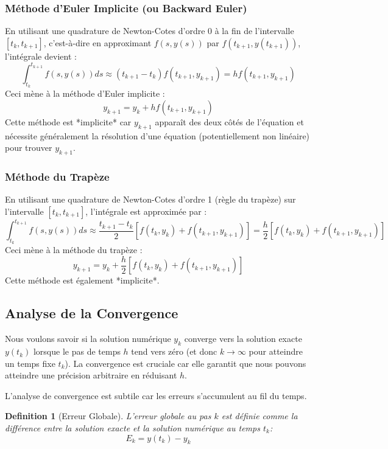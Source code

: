 \documentclass{article}
\newtheorem{definition}{Definition}
\begin{document}
\subsubsection*{Méthode d'Euler Implicite (ou Backward Euler)}

En utilisant une quadrature de Newton-Cotes d'ordre 0 à la fin de l'intervalle $[t_k, t_{k+1}]$, c'est-à-dire en approximant $f(s, y(s))$ par $f(t_{k+1}, y(t_{k+1}))$, l'intégrale devient :
\[ \int_{t_k}^{t_{k+1}} f(s, y(s)) ds \approx (t_{k+1} - t_k) f(t_{k+1}, y_{k+1}) = h f(t_{k+1}, y_{k+1}) \]
Ceci mène à la méthode d'Euler implicite :
\[ y_{k+1} = y_k + h f(t_{k+1}, y_{k+1}) \]
Cette méthode est *implicite* car $y_{k+1}$ apparaît des deux côtés de l'équation et nécessite généralement la résolution d'une équation (potentiellement non linéaire) pour trouver $y_{k+1}$.

\subsubsection*{Méthode du Trapèze}

En utilisant une quadrature de Newton-Cotes d'ordre 1 (règle du trapèze) sur l'intervalle $[t_k, t_{k+1}]$, l'intégrale est approximée par :
\[ \int_{t_k}^{t_{k+1}} f(s, y(s)) ds \approx \frac{t_{k+1} - t_k}{2} [f(t_k, y_k) + f(t_{k+1}, y_{k+1})] = \frac{h}{2} [f(t_k, y_k) + f(t_{k+1}, y_{k+1})] \]
Ceci mène à la méthode du trapèze :
\[ y_{k+1} = y_k + \frac{h}{2} [f(t_k, y_k) + f(t_{k+1}, y_{k+1})] \]
Cette méthode est également *implicite*.

\subsection*{Analyse de la Convergence}

Nous voulons savoir si la solution numérique $y_k$ converge vers la solution exacte $y(t_k)$ lorsque le pas de temps $h$ tend vers zéro (et donc $k \to \infty$ pour atteindre un temps fixe $t_k$). La convergence est cruciale car elle garantit que nous pouvons atteindre une précision arbitraire en réduisant $h$.

L'analyse de convergence est subtile car les erreurs s'accumulent au fil du temps.

\begin{definition}[Erreur Globale]
L'erreur globale au pas $k$ est définie comme la différence entre la solution exacte et la solution numérique au temps $t_k$:
\[ E_k = y(t_k) - y_k \]
\end{definition}
\end{document}
